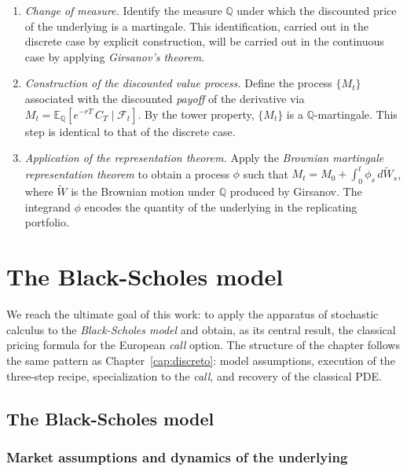 \documentclass[11pt,a4paper,oneside]{report}
\theoremstyle{plain}
\theoremstyle{definition}
\theoremstyle{remark}
\newcommand{\E}{\mathbb{E}}
\newcommand{\Q}{\mathbb{Q}}
\newcommand{\F}{\mathcal{F}}
\newcommand{\1}{\mathbf{1}}
\begin{document}
\begin{enumerate}[label=\textbf{Step \arabic*.}, leftmargin=*]
  \item \emph{Change of measure.} Identify the measure $\Q$ under
        which the discounted price of the underlying is a martingale.
        This identification, carried out in the discrete case by
        explicit construction, will be carried out in the continuous
        case by applying \emph{Girsanov's theorem}.
  \item \emph{Construction of the discounted value process.} Define
        the process $\{M_t\}$ associated with the discounted
        \emph{payoff} of the derivative via
        $M_t = \E_\Q[e^{-rT}\, C_T \mid \F_t]$. By the tower property,
        $\{M_t\}$ is a $\Q$-martingale. This step is identical to
        that of the discrete case.
  \item \emph{Application of the representation theorem.} Apply the
        \emph{Brownian martingale representation theorem} to obtain
        a process $\phi$ such that
        $M_t = M_0 + \int_0^t \phi_s\, d\widetilde{W}_s$, where
        $\widetilde{W}$ is the Brownian motion under $\Q$ produced by
        Girsanov. The integrand $\phi$ encodes the quantity of the
        underlying in the replicating portfolio.
\end{enumerate}

\chapter{The Black-Scholes model}\label{cap:bs}

We reach the ultimate goal of this work: to apply the apparatus of
stochastic calculus to the \emph{Black-Scholes model} and obtain, as
its central result, the classical pricing formula for the European
\emph{call} option. The structure of the chapter follows the same
pattern as Chapter~\ref{cap:discreto}: model assumptions, execution
of the three-step recipe, specialization to the \emph{call}, and
recovery of the classical PDE.

\section{The Black-Scholes model}
\label{sec:modelo_bs}

\subsection{Market assumptions and dynamics of the underlying}
\label{subsec:hipotesis_modelo_bs}
\end{document}
